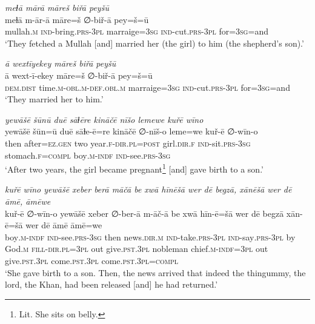 \ea \label{KŠ.88}
\textit{meɫā mārā māreš biřā peyšū} \\ 
\gll meɫā m-ār-ā māre=š ∅-biř-ā pey=š=ū \\ 
 mullah\textsc{.m} \textsc{ind-}bring\textsc{.prs}\textsc{-3pl} marraige\textsc{=3sg} \textsc{ind-}cut\textsc{.prs}\textsc{-3pl} for\textsc{=3sg}=and \\ 
\glt `They fetched a Mullah [and] married her (the girl) to him (the shepherd’s son).'
\z 
 
\ea \label{KŠ.89}
\textit{ā wextīyekey māreš biřā peyšū} \\ 
\gll ā wext-ī-ekey māre=š ∅-biř-ā pey=š=ū \\ 
 \textsc{dem.dist} time\textsc{.m}\textsc{-obl}\textsc{.m}\textsc{-def}\textsc{.obl}\textsc{.m} marraige\textsc{=3sg} \textsc{ind-}cut\textsc{.prs}\textsc{-3pl} for\textsc{=3sg}=and \\ 
\glt `They married her to him.'
\z 
 
\ea \label{KŠ.92}
\textit{yewāšē šūnū duē sāɫēre kināčē nīšo lemewe kuřē wīno} \\ 
\gll yewāšē šūn=ū duē sāɫe-ē=re kināčē ∅-nīš-o leme=we kuř-ē ∅-wīn-o \\ 
 then after\textsc{\textsc{=ez.gen}} two year\textsc{.f}\textsc{-dir}\textsc{.pl}\textsc{=\textsc{post}} girl\textsc{.dir}\textsc{.f} \textsc{ind-}sit\textsc{.prs}\textsc{-3sg} stomach\textsc{.f}\textsc{=compl} boy\textsc{.m}\textsc{-indf} \textsc{ind-}see\textsc{.prs}\textsc{-3sg} \\ 
\glt `After two years, the girl became pregnant\footnote{Lit. She sits on belly.} [and] gave birth to a son.'
\z 
 
\ea \label{KŠ.93}
\textit{kuřē wīno yewāšē xeber berā māčā be xwā hīnēšā wer dē begzā, xānēšā wer dē āmē, āmēwe} \\ 
\gll kuř-ē ∅-wīn-o yewāšē xeber ∅-ber-ā m-āč-ā be xwā hīn-ē=šā wer dē begzā xān-ē=šā wer dē āmē āmē=we \\ 
 boy\textsc{.m}\textsc{-indf} \textsc{ind-}see\textsc{.prs}\textsc{-3sg} then news\textsc{.dir}\textsc{.m} \textsc{ind-}take\textsc{.prs}\textsc{-3pl} \textsc{ind-}say\textsc{.prs}\textsc{-3pl} by God\textsc{.m} \textsc{fill}\textsc{-dir}\textsc{.pl}\textsc{=3pl} out give\textsc{.pst}\textsc{.3pl} nobleman chief\textsc{.m}\textsc{-indf}\textsc{=3pl} out give\textsc{.pst}\textsc{.3pl} come\textsc{.pst}\textsc{.3pl} come\textsc{.pst}\textsc{.3pl}\textsc{=compl} \\ 
\glt `She gave birth to a son. Then, the news arrived that indeed the thingummy, the lord, the Khan, had been released [and] he had returned.'
\z 
 
